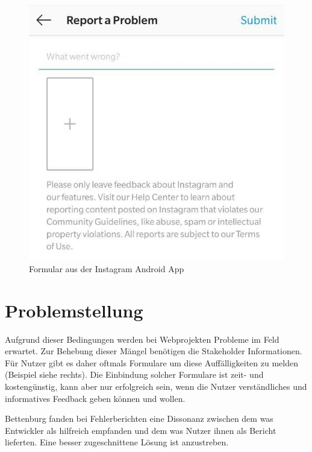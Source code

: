 \begin{figure}
	\centering
	\vspace{-\baselineskip}
	\includegraphics[width=\linewidth]{img/instagram-feedback/instagram-feedback.jpg}
	\caption{Formular aus der Instagram \cite{Instagram} Android App}
	\label{fig:instagram-feedback-example}
\end{figure}

\section{Problemstellung}

Aufgrund dieser Bedingungen werden bei Webprojekten Probleme im Feld erwartet. Zur Behebung dieser Mängel benötigen die Stakeholder Informationen. Für Nutzer gibt es daher oftmals Formulare um diese Auffälligkeiten zu melden (Beispiel siehe rechts). Die Einbindung solcher Formulare ist zeit- und kostengünstig, kann aber nur erfolgreich sein, wenn die Nutzer verständliches und informatives Feedback geben können und wollen.

Bettenburg \etal \cite{WhatMakesAGoodBugReport} fanden bei Fehlerberichten eine Dissonanz zwischen dem was Entwickler als hilfreich empfanden und dem was Nutzer ihnen als Bericht lieferten. Eine besser zugeschnittene Lösung ist anzustreben. %

